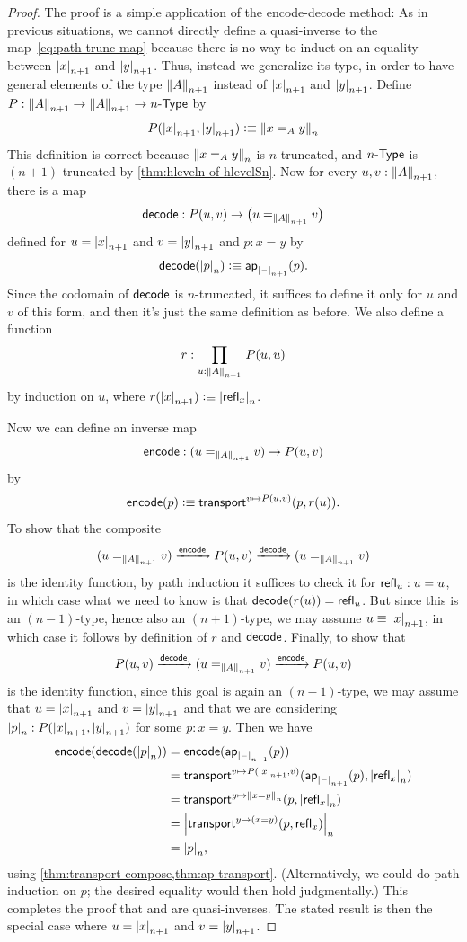 \begin{proof}
  The proof is a simple application of the encode-decode method:
  As in previous situations, we cannot directly define a quasi-inverse to the map~\eqref{eq:path-trunc-map} because there is no way to induct on an
equality between $\tproj {n+1}x$ and $\tproj {n+1}y$.
  Thus, instead we generalize its type, in order to have general elements of the type $\trunc{n+1}A$ instead of $\tproj {n+1}x$ and $\tproj
{n+1}y$.
  Define $P:\trunc {n+1}A\to\trunc {n+1}A\to\typele{n}$ by
  \[P(\tproj {n+1}x,\tproj {n+1}y)\defeq \trunc n{x=_Ay}\]
  This definition is correct because $\trunc n{x=_Ay}$ is $n$-truncated, and $\typele{n}$ is $(n+1)$-truncated by
\cref{thm:hleveln-of-hlevelSn}.
  Now for every $u,v:\trunc{n+1}A$, there is a map
  \[\decode:P(u,v) \to \big(u=_{\trunc{n+1}A}v\big)\]
  defined for $u=\tproj {n+1}x$ and $v=\tproj {n+1}y$ and $p:x=y$ by
  \[\decode(\tproj n{p})\defeq \apfunc{\tprojf{n+1}} (p).\]
  Since the codomain of $\decode$ is $n$-truncated, it suffices to define it only for $u$ and $v$ of this form, and then it's just the same
definition as before.
  We also define a function
  \[ r : \prd{u:\trunc{n+1} A} P(u,u) \]
  by induction on $u$, where $r(\tproj{n+1} x) \defeq \tproj n {\refl x}$.

  Now we can define an inverse map
  \[\encode: (u=_{\trunc{n+1}A}v) \to P(u,v)\]
  by
  \[\encode(p) \defeq \transfib{v\mapsto P(u,v)}{p}{r(u)}. \]
  To show that the composite
  \[ (u=_{\trunc{n+1}A}v) \xrightarrow{\encode} P(u,v) \xrightarrow{\decode} (u=_{\trunc{n+1}A}v) \]
  is the identity function, by path induction it suffices to check it for $\refl u : u=u$, in which case what we need to know is that
$\decode(r(u)) = \refl{u}$.
  But since this is an $(n-1)$-type, hence also an $(n+1)$-type, we may assume $u\jdeq \tproj {n+1} x$, in which case it follows by definition
of $r$ and $\decode$.
  Finally, to show that
  \[ P(u,v) \xrightarrow{\decode} (u=_{\trunc{n+1}A}v) \xrightarrow{\encode} P(u,v) \]
  is the identity function, since this goal is again an $(n-1)$-type, we may assume that $u=\tproj {n+1}x$ and $v=\tproj {n+1}y$ and that we are
considering $\tproj n p:P(\tproj{n+1}x,\tproj{n+1}y)$ for some $p:x=y$.
  Then we have
  \begin{align*}
    \encode(\decode(\tproj n p)) &= \encode(\apfunc{\tprojf{n+1}}(p))\\
    &= \transfib{v\mapsto P(\tproj{n+1}x,v)}{\apfunc{\tprojf{n+1}}(p)}{\tproj n {\refl x}}\\
    &= \transfib{y\mapsto \trunc n{x=y}}{p}{\tproj n {\refl x}}\\
    &= \tproj n {\transfib{y \mapsto (x=y)}{p}{\refl x}}\\
    &= \tproj n p,
  \end{align*}
  using \cref{thm:transport-compose,thm:ap-transport}.
  (Alternatively, we could do path induction on $p$; the desired equality would then hold judgmentally.)
  This completes the proof that \decode and \encode are quasi-inverses.
  The stated result is then the special case where $u=\tproj {n+1}x$ and $v=\tproj {n+1}y$.
\end{proof}

